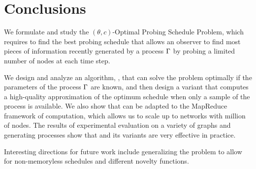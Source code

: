 \section{Conclusions}\label{sec:concl}
We formulate and study the $(\theta,c)$-Optimal Probing Schedule Problem,
which requires to find the best probing schedule that allows an observer to find
most pieces of information recently generated by a process $\Gamma$ by probing a
limited number of nodes at each time step.

We design and analyze an algorithm, \algoname, that can solve the problem
optimally if the parameters of the process $\Gamma$ are known, and then design a
variant that computes a high-quality approximation of the optimum schedule when
only a sample of the process is available. We also show that \algoname can be
adapted to the MapReduce framework of computation, which allows us to scale up
to networks with million of nodes. The results of experimental evaluation on a
variety of graphs and generating processes show that \algoname and its variants
are very effective in practice.

Interesting directions for future work include generalizing the problem to allow
for non-memoryless schedules and different novelty functions.
